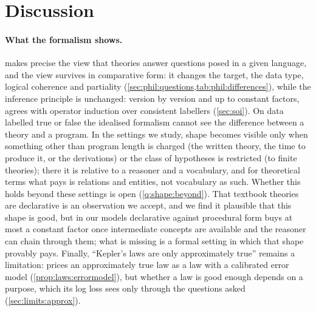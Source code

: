 
\section{Discussion}\label{sec:discussion}

\paragraph{What the formalism shows.} \SAI makes precise the view that theories answer questions posed in a given language, and the view survives in comparative form: it changes the target, the data type, logical coherence and partiality (\cref{sec:phil:questions,tab:phil:differences}), while the inference principle is unchanged: version by version and up to constant factors, \SAIabbr agrees with operator induction over consistent labellers (\cref{sec:soi}). On data labelled true or false the idealised formalism cannot see the difference between a theory and a program. In the settings we study, shape becomes visible only when something other than program length is charged (the written theory, the time to produce it, or the derivations) or the class of hypotheses is restricted (to finite theories); there it is relative to a reasoner and a vocabulary, and for theoretical terms what pays is relations and entities, not vocabulary as such. Whether this holds beyond these settings is open (\cref{q:shape:beyond}). That textbook theories are declarative is an observation we accept, and we find it plausible that this shape is good, but in our models declarative against procedural form buys at most a constant factor once intermediate concepts are available and the reasoner can chain through them; what is missing is a formal setting in which that shape provably pays. Finally, ``Kepler's laws are only approximately true'' remains a limitation: \SAIabbr prices an approximately true law as a law with a calibrated error model (\cref{prop:laws:errormodel}), but whether a law is good enough depends on a purpose, which its log loss sees only through the questions asked (\cref{sec:limits:approx}).

